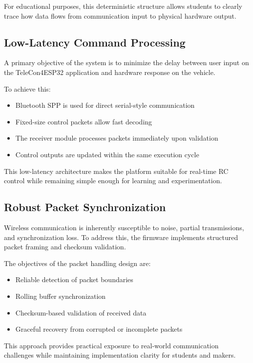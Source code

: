 For educational purposes, this deterministic structure allows students to clearly trace how data flows from communication input to physical hardware output.

\subsection{Low-Latency Command Processing}

A primary objective of the system is to minimize the delay between user input on the TeleCon4ESP32 application and hardware response on the vehicle.

To achieve this:

\begin{itemize}
	\item Bluetooth SPP is used for direct serial-style communication
	\item Fixed-size control packets allow fast decoding
	\item The receiver module processes packets immediately upon validation
	\item Control outputs are updated within the same execution cycle
\end{itemize}

This low-latency architecture makes the platform suitable for real-time RC control while remaining simple enough for learning and experimentation.

\subsection{Robust Packet Synchronization}

Wireless communication is inherently susceptible to noise, partial transmissions, and synchronization loss. To address this, the firmware implements structured packet framing and checksum validation.

The objectives of the packet handling design are:

\begin{itemize}
	\item Reliable detection of packet boundaries
	\item Rolling buffer synchronization
	\item Checksum-based validation of received data
	\item Graceful recovery from corrupted or incomplete packets
\end{itemize}

This approach provides practical exposure to real-world communication challenges while maintaining implementation clarity for students and makers.

